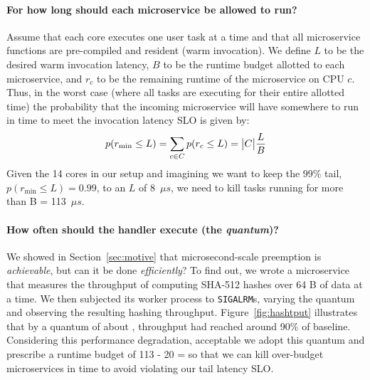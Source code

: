\paragraph{For how long should each microservice be allowed to run?}
Assume that each core executes one user task at a
time and that all microservice
functions are pre-compiled and resident (warm invocation).
We define $L$ to be the desired warm invocation latency, $B$ to be the
runtime budget allotted to each microservice, and $r_c$ to be the remaining runtime
of the microservice on CPU $c$.  Thus, in the worst case (where all tasks are
executing for their entire allotted time) the probability that the incoming
microservice will have somewhere to run in time to meet the invocation
latency SLO is given by:
\vspace{-10pt}
\begin{equation}
p(r_\textrm{min} \le L) = \sum\limits_{c \in C} p(r_c \le L) = \big| C \big| \frac{L}{B}
\vspace{-10pt}
\end{equation}
Given the 14 cores in our setup and imagining we want to keep the 99\% tail,
$p(r_\textrm{min} \le L) = 0.99$, to an $L$ of 8~$\mu{}s$, we need to kill tasks
running for more than B = 113~$\mu{}s$.

\paragraph{How often should the handler execute (the \emph{quantum})?}
We showed in Section~\ref{sec:motive} that microsecond-scale preemption is
\textit{achievable}, but can it be done \textit{efficiently}?  To find out, we wrote
a microservice that measures the throughput of computing SHA-512 hashes over 64 B of
data at a time.  We then subjected its worker process to \texttt{SIGALRM}s, varying
the quantum and observing the resulting hashing throughput.
Figure~\ref{fig:hashtput} illustrates that by a quantum of about , throughput
had reached around 90\% of baseline.  Considering this performance degradation,
acceptable we adopt this quantum and prescribe a runtime budget of 113 - 20 = 
so that we can kill over-budget microservices in time to avoid violating our tail
latency SLO.


